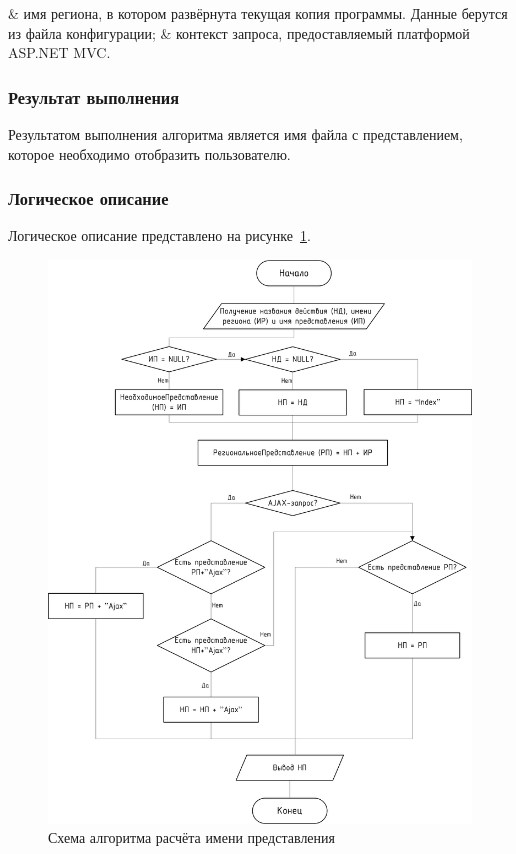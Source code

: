 \begin{easylist}
& имя региона, в котором развёрнута текущая копия программы. Данные берутся из файла конфигурации;
& контекст запроса, предоставляемый платформой ASP.NET MVC.
\end{easylist}

\subsubsection*{Результат выполнения}

Результатом выполнения алгоритма является имя файла с представлением, которое необходимо отобразить пользователю.

\subsubsection*{Логическое описание}

Логическое описание представлено на рисунке~\ref{img:algo-views}.

\begin{figure}[h!]
	\begin{center}
		\begin{minipage}[h]{\linewidth}
			\includegraphics[width=\linewidth]{images/algo-views.png}
			\caption{Схема алгоритма расчёта имени представления}
			\label{img:algo-views}
		\end{minipage}
		\hfill
	\end{center}
\end{figure}  

